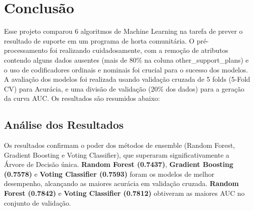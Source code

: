 \section*{Conclusão}

Esse projeto comparou 6 algoritmos de Machine Learning na tarefa de prever o resultado de suporte em um programa de horta comunitária.
O pré-processamento foi realizando cuidadosamente, com a remoção de atributos contendo alguns dados ausentes (mais de 80\% na coluna other\_support\_plans) e o uso de codificadores ordinais e nominais foi crucial para o sucesso dos modelos.
A avaliação dos modelos foi realizada usando validação cruzada de 5 folds (5-Fold CV) para Acurácia, e uma divisão de validação (20\% dos dados) para a geração da curva AUC. Os resultados são resumidos abaixo:

\begin{center}
\label{tab:resized}
\end{center}

\subsection*{Análise dos Resultados}
Os resultados confirmam o poder dos métodos de ensemble (Random Forest, Gradient Boosting e Voting Classifier), que superaram significativamente a Árvore de Decisão única.
\textbf{Random Forest (0.7437)},  \textbf{Gradient Boosting (0.7578)} e \textbf{Voting Classifier (0.7593)} foram os modelos de melhor desempenho, alcançando as maiores acurácia em validação cruzada. \textbf{Random Forest (0.7842)} e \textbf{Voting Classifier (0.7812)} obtiveram as maiores AUC no conjunto de validação.


